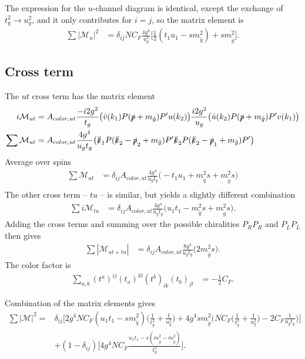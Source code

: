 \documentclass[twoside,english]{uiofysmaster}
\begin{document}
The expression for the $u$-channel diagram is identical, except the exchange of $t_g^2 \rightarrow u_g^2$, and it only contributes for $i =j$, so the matrix element is
\begin{align*}
\sum |\mathcal{M}_u|^2 &= \delta_{ij} NC_F \frac{4g^4}{u_g^2} \Big[ \frac{1}{2}(t_1u_1-sm_{\tilde{q}}^2) + sm_{\tilde{g}}^2 \Big]. 
\end{align*}


\subsection*{Cross term}
The $ut$ cross term has the matrix element
\begin{align*}
i \mathcal{M}_{ut} &= A_{color, ut}\frac{-i 2 g^2}{t_g}\big( \bar{v} (k_1)  P (\slashed{p} + m_{\tilde{g}}) P'u(k_2) \big)  \frac{i 2 g^2}{u_g} \big( \bar{u} (k_2)  P (\slashed{p} + m_{\tilde{g}}) P' v(k_1) \big)\\
\sum \mathcal{M}_{ut} &= A_{color, ut} \frac{4 g^4}{u_gt_g}\big( \slashed{k}_1   P (\slashed{k}_2 - \slashed{p}_2 + m_{\tilde{g}}) P'\slashed{k}_2  P (\slashed{k}_2 -\slashed{p}_1 + m_{\tilde{g}}) P' \big)\\
\end{align*}
Average over spins
\begin{align*}
\sum  \mathcal{M}_{ut} 
  &= \delta_{ij} A_{color, ut} \frac{4 g^4}{u_gt_g} \big(
  -   t_1 u_1 + m_{\tilde{q}}^2 s 
+  m_{\tilde{g}}^2 s
  \big)\\
\end{align*}
The other cross term --  $tu$ -- is similar, but yields a slightly different combination
\begin{align*}
\sum i \mathcal{M}_{tu} 
  &= \delta_{ij} A_{color, ut} \frac{4 g^4}{u_gt_g} \big(
u_1t_1- m_{\tilde{q}}^2s + m_{\tilde{g}}^2s
  \big).
\end{align*}
Adding the cross terms and summing over the possible chiralities $P_RP_R$ and $P_LP_L$ then gives 
\begin{align*}
\sum |\mathcal{M}_{ut+tu}| &= \delta_{ij} A_{color, ut} \frac{8 g^4}{u_gt_g} \big(2 m_{\tilde{g}}^2s   \big).
\end{align*}
The color factor is
\begin{align*}
\sum_{a,b}(t^a)^{ij}(t_a)^{kl}(t^b)_{ik}(t_b)_{jl} 
 &= - \frac{1}{2}C_F.
\end{align*}



Combination of the matrix elements gives
\begin{align*}
\sum |\mathcal{M}|^2 =& \delta_{ij}  \Bigg[2 g^4NC_F(u_1t_1-sm_{\tilde{q}}^2) \big( \frac{1}{t_g^2} + \frac{1}{u_g^2} \big) + 4 g^4 sm_{\tilde{g}}^2 \Big( NC_F \big(\frac{1}{t_g^2} + \frac{1}{u_g^2}\big) -2C_F\frac{1}{u_gt_g} \Big) \Bigg]\\
&+ (1-\delta_{ij})\Bigg[4g^4NC_F  \frac{u_1t_1-s(m_{\tilde{g}}^2-m_{\tilde{g}}^2)}{t_g^2} \Bigg].
\end{align*}
\end{document}
